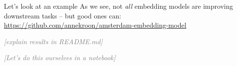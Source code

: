\documentclass[compress]{beamer}
\newcommand{\instruction}[1]{\emph{\textcolor{gray}{[#1]}}}
\begin{document}
	
	
	
\begin{frame}{Let's look at an example}
	As we see, not \emph{all} embedding models are improving downstream tasks -- but good ones can:
\url{https://github.com/annekroon/amsterdam-embedding-model}

\instruction{explain results in README.md}
\end{frame}
	
\begin{frame}[plain]
\instruction{Let's do this ourselves in a notebook}
\end{frame}




\begin{frame}[plain]
	\printbibliography
\end{frame}
\end{document}

